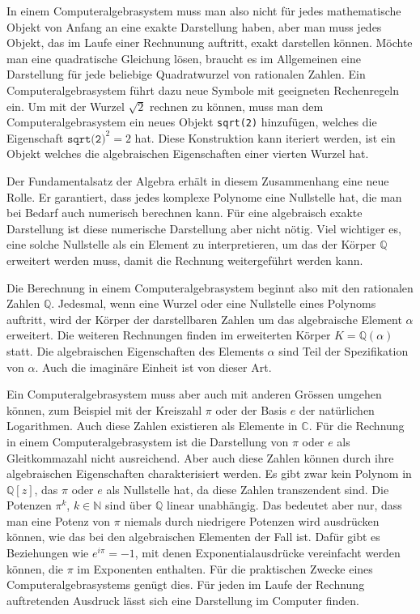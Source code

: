 In einem Computeralgebrasystem muss man also nicht für jedes mathematische
Objekt von Anfang an eine exakte Darstellung haben, aber man muss
jedes Objekt, das im Laufe einer Rechnunung auftritt, exakt darstellen
können.
Möchte man eine quadratische Gleichung lösen, braucht es im Allgemeinen
eine Darstellung für jede beliebige Quadratwurzel von rationalen
Zahlen.
Ein Computeralgebrasystem führt dazu neue Symbole mit geeigneten
Rechenregeln ein.
Um mit der Wurzel $\!\sqrt{2}$ rechnen zu können, muss man dem
Computeralgebrasystem ein neues Objekt \texttt{sqrt(2)} hinzufügen,
welches die Eigenschaft $\texttt{sqrt(2)}^2 = 2$ hat.
Diese Konstruktion kann iteriert werden,  ist
ein Objekt welches die algebraischen Eigenschaften einer vierten Wurzel
hat.

Der Fundamentalsatz der Algebra erhält in diesem Zusammenhang eine
neue Rolle.
Er garantiert, dass jedes komplexe Polynome eine Nullstelle hat, die
man bei Bedarf auch numerisch berechnen kann.
Für eine algebraisch exakte Darstellung ist diese numerische Darstellung
aber nicht nötig.
Viel wichtiger es, eine solche Nullstelle als ein Element zu interpretieren,
um das der Körper $\mathbb{Q}$ erweitert werden muss, damit die Rechnung
weitergeführt werden kann.

Die Berechnung in einem Computeralgebrasystem beginnt also mit den rationalen
Zahlen $\mathbb{Q}$.
Jedesmal, wenn eine Wurzel oder eine Nullstelle eines Polynoms auftritt,
wird der Körper der darstellbaren Zahlen um das algebraische Element
$\alpha$ erweitert.
Die weiteren Rechnungen finden im erweiterten Körper $K=\mathbb{Q}(\alpha)$
statt.
Die algebraischen Eigenschaften des Elements $\alpha$ sind Teil der
Spezifikation von $\alpha$.
Auch die imaginäre Einheit ist von dieser Art.

Ein Computeralgebrasystem muss aber auch mit anderen Grössen umgehen
können, zum Beispiel mit der Kreiszahl $\pi$ oder der Basis $e$
%
%
%
der natürlichen Logarithmen.
Auch diese Zahlen existieren als Elemente in $\mathbb{C}$.
Für die Rechnung in einem Computeralgebrasystem ist die Darstellung von $\pi$
oder $e$ als Gleitkommazahl nicht ausreichend.
Aber auch diese Zahlen können durch ihre algebraischen Eigenschaften
charakterisiert werden.
Es gibt zwar kein Polynom in $\mathbb{Q}[z]$, das $\pi$ oder $e$ als
Nullstelle hat, da diese Zahlen transzendent sind.
Die Potenzen $\pi^k$, $k\in\mathbb{N}$ sind über $\mathbb{Q}$ linear
unabhängig.
Das bedeutet aber nur, dass man eine Potenz von $\pi$ niemals
durch niedrigere Potenzen wird ausdrücken können, wie das bei den
algebraischen Elementen der Fall ist.
Dafür gibt es Beziehungen wie $e^{i\pi}=-1$, mit denen Exponentialausdrücke
vereinfacht werden können, die $\pi$ im Exponenten enthalten.
Für die praktischen Zwecke eines Computeralgebrasystems genügt dies.
Für jeden im Laufe der Rechnung auftretenden Ausdruck lässt sich eine
Darstellung im Computer finden.

